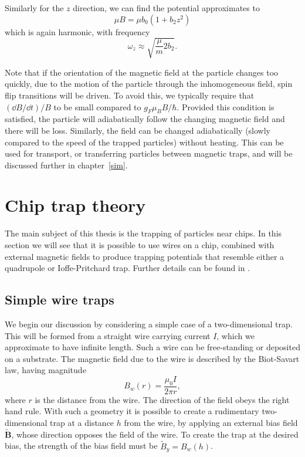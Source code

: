 Similarly for the $z$ direction, we can find the potential
approximates to
%
\begin{equation}
  \mu B = \mu b_0 (1 + b_2 z^2)
\end{equation}
%
which is again harmonic, with frequency
%
\begin{equation}
  \omega_z \approx \sqrt{\frac{\mu}{m}2b_2}.
\end{equation}

Note that if the orientation of the magnetic field at the particle changes too
quickly, due to the motion of the particle through the inhomogeneous field,
spin flip transitions will be driven. To avoid this, we typically require that
$(\dd B/\dd t)/B$ to be small compared to $g_F \mu_B B/\hbar$. Provided this
condition is satisfied, the particle will adiabatically follow the changing
magnetic field and there will be loss.
%
Similarly, the field can be changed adiabatically (slowly compared to the speed
of the trapped particles) without heating. This can be used for
transport, or transferring particles between magnetic traps, and will be
discussed further in chapter~\ref{sim}.

\section{Chip trap theory}
\label{theory:chips}

The main subject of this thesis is the trapping of particles near chips. In
this section we will see that it is possible to use wires on a chip, combined
with external magnetic fields to produce trapping potentials that resemble
either a quadrupole or Ioffe-Pritchard trap. Further details can be found in
.

\subsection{Simple wire traps}
\label{theory:simple}

We begin our discussion by considering a simple case of a two-dimensional trap.
This will be formed from a straight wire carrying current $I$, which we
approximate to have infinite length. Such a wire can be free-standing or
deposited on a substrate. The magnetic field due to the wire is described by
the Biot-Savart law, having magnitude
%
\begin{equation}
  B_w(r) = \frac{\mu_0 I}{2 \pi r},
  \label{theory:eqn:wire}
\end{equation}
%
where $r$ is the distance from the wire. The direction of the field obeys the
right hand rule. With such a geometry it is possible to create a rudimentary
two-dimensional trap at a distance $h$ from the wire, by applying an external
bias field $\mathbf{\tilde{B}}$, whose direction opposes the field of the wire.
To create the trap at the desired bias, the strength of the bias field must be
$\tilde{B}_y = B_w(h)$.

